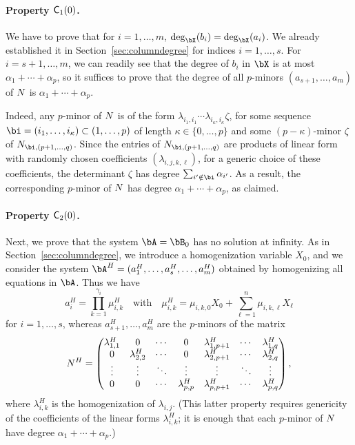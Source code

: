\documentclass[12pt]{article}
\begin{document}
\paragraph{Property $\mathsf{C}_1(0)$.} We have to prove that for $i=1,\dots,m$,
$\deg_\bX(b_i)=\deg_\bX(a_i)$. We already established it in
Section~\ref{sec:columndegree} for indices $i=1,\dots,s$. For
$i=s+1,\dots,m$, we can readily see that the degree of $b_i$ in $\bX$ is at most
$\alpha_1 + \cdots + \alpha_p$, so it suffices to prove that the
degree of all $p$-minors $(a_{s+1},\dots,a_m)$ of ${N}$ is $\alpha_1 +
\cdots + \alpha_p$.

Indeed, any $p$-minor of ${N}$ is of the form $\lambda_{i_1,i_1}
\cdots \lambda_{i_\kappa,i_\kappa} \zeta$, for some sequence
$\bi=(i_1,\dots,i_\kappa) \subset (1,\dots,p)$ of length $\kappa \in
\{0,\dots,p\}$ and some $(p-\kappa)$-minor $\zeta$ of $\mN_{\bi
,(p+1,\dots,q)}$.  Since the entries of $\mN_{\bi
,(p+1,\dots,q)}$ are products of linear form with randomly
chosen coefficients $(\lambda_{i,j,k,\ell})$, for a generic choice of
these coefficients, the determinant $\zeta$ has degree
$\sum_{i' \notin \bi} \alpha_{i'}$. As a result, the corresponding
$p$-minor of ${N}$ has degree $\alpha_1 + \cdots + \alpha_p$, as
claimed.

\paragraph{Property $\mathsf{C}_2(0)$.} Next, we prove that the system $\bA=\bB_0$ has no solution 
at infinity. As in Section~\ref{sec:columndegree}, we introduce a homogenization
variable $X_0$, and we consider the system $\bA^H=(a_1^H,\dots,a_s^H,\dots,a_m^H)$ obtained 
by homogenizing all equations in $\bA$. Thus we have
$$a_i^H=\prod_{k=1}^{\gamma_i} \mu^H_{i,k} \quad\text{with}\quad \mu^H_{i,k}=\mu_{i,k,0}X_0 + \sum_{\ell = 1}^{n}\mu_{i,k,\ell}X_\ell$$
for $i=1,\dots,s$, whereas $a_{s+1}^H,\dots,a_m^H$ are the $p$-minors of the matrix
\begin{align*}
{N}^H = \left( \begin{matrix}
\lambda^H_{1,1} & 0 & \cdots & 0 & \lambda^H_{1,p+1} & \cdots & \lambda^H_{1, q}\\
0 & \lambda^H_{2,2} & \cdots & 0 & \lambda^H_{2,p+1} & \cdots & \lambda^H_{2, q}\\
\vdots & \vdots & \ddots & \vdots & \vdots & \ddots & \vdots\\
0 & 0 & \cdots & \lambda^H_{p,p} & \lambda^H_{p,p+1} & \cdots & \lambda^H_{p, q}
\end{matrix} \right),  
\end{align*}
where $\lambda^H_{i,k}$ is the homogenization of
$\lambda_{i,j}$. (This latter property requires genericity of the
coefficients of the linear forms $\lambda^H_{i,k}$; it is enough that 
each $p$-minor of ${N}$ have degree $\alpha_1 + \cdots + \alpha_p$.)
\end{document}
